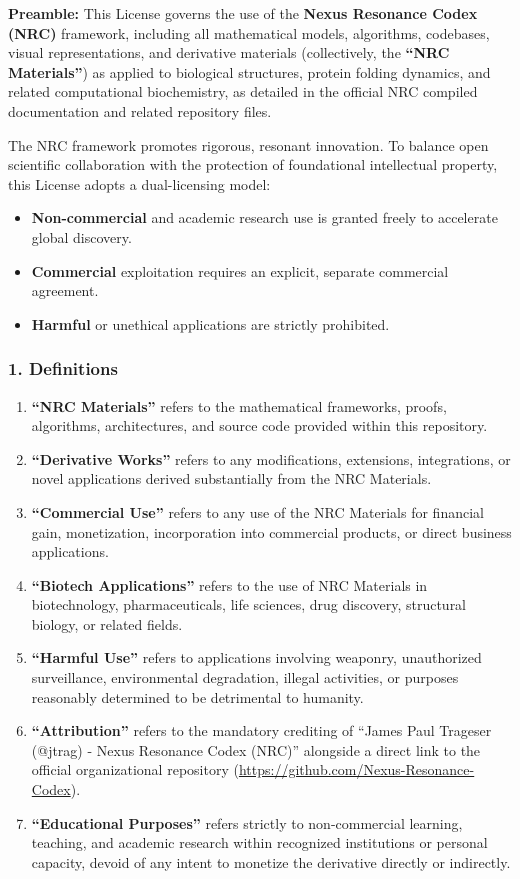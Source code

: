 \documentclass[11pt,a4paper,oneside]{article}
\begin{document}
	\textbf{Preamble:} This License governs the use of the \textbf{Nexus Resonance Codex (NRC)} framework, including all mathematical models, algorithms, codebases, visual representations, and derivative materials (collectively, the \textbf{``NRC Materials''}) as applied to biological structures, protein folding dynamics, and related computational biochemistry, as detailed in the official NRC compiled documentation and related repository files.

	The NRC framework promotes rigorous, resonant innovation. To balance open scientific collaboration with the protection of foundational intellectual property, this License adopts a dual-licensing model:

	\begin{itemize}
		\item \textbf{Non-commercial} and academic research use is granted freely to accelerate global discovery.
		\item \textbf{Commercial} exploitation requires an explicit, separate commercial agreement.
		\item \textbf{Harmful} or unethical applications are strictly prohibited.
	\end{itemize}

	\subsubsection*{1. Definitions}
	\begin{enumerate}
		\item \textbf{``NRC Materials''} refers to the mathematical frameworks, proofs, algorithms, architectures, and source code provided within this repository.
		\item \textbf{``Derivative Works''} refers to any modifications, extensions, integrations, or novel applications derived substantially from the NRC Materials.
		\item \textbf{``Commercial Use''} refers to any use of the NRC Materials for financial gain, monetization, incorporation into commercial products, or direct business applications.
		\item \textbf{``Biotech Applications''} refers to the use of NRC Materials in biotechnology, pharmaceuticals, life sciences, drug discovery, structural biology, or related fields.
		\item \textbf{``Harmful Use''} refers to applications involving weaponry, unauthorized surveillance, environmental degradation, illegal activities, or purposes reasonably determined to be detrimental to humanity.
		\item \textbf{``Attribution''} refers to the mandatory crediting of ``James Paul Trageser (@jtrag) - Nexus Resonance Codex (NRC)'' alongside a direct link to the official organizational repository (\url{https://github.com/Nexus-Resonance-Codex}).
		\item \textbf{``Educational Purposes''} refers strictly to non-commercial learning, teaching, and academic research within recognized institutions or personal capacity, devoid of any intent to monetize the derivative directly or indirectly.
	\end{enumerate}
\end{document}
